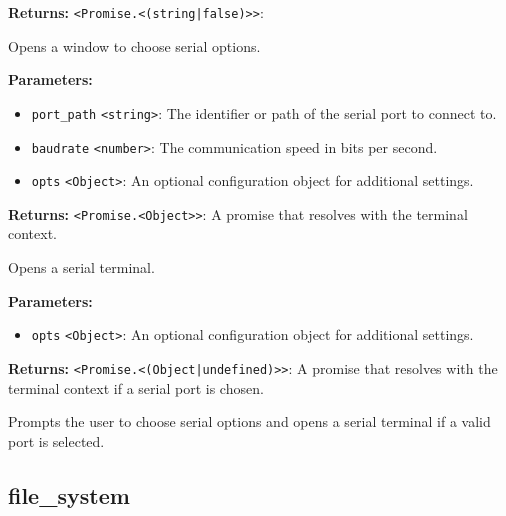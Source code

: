 \documentclass[12pt,a4paper]{article}
\begin{document}
\noindent \textbf{Returns:} \texttt{<Promise.<(string|false)>>}:

\noindent Opens a window to choose serial options.

\vspace{5mm}
\noindent {}


\noindent \textbf{Parameters:}
\begin{itemize}
  \item \texttt{port\_path} \texttt{<string>}: The identifier or path of the serial port to connect to.
  \item \texttt{baudrate} \texttt{<number>}: The communication speed in bits per second.
  \item \texttt{opts} \texttt{<Object>}: An optional configuration object for additional settings.
\end{itemize}

\noindent \textbf{Returns:} \texttt{<Promise.<Object>>}: A promise that resolves with the terminal context.

\noindent Opens a serial terminal.

\vspace{5mm}
\noindent {}


\noindent \textbf{Parameters:}
\begin{itemize}
  \item \texttt{opts} \texttt{<Object>}: An optional configuration object for additional settings.
\end{itemize}

\noindent \textbf{Returns:} \texttt{<Promise.<(Object|undefined)>>}: A promise that resolves with the terminal context if a serial port is chosen.

\noindent Prompts the user to choose serial options and opens a serial terminal if a valid port is selected.


\subsection{file\_system}
\vspace{5mm}
\noindent {}
\end{document}
